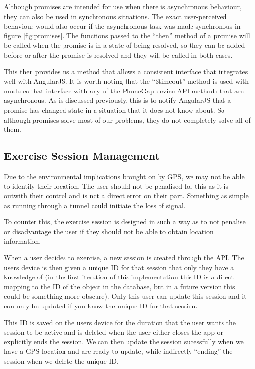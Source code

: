 Although promises are intended for use when there is asynchronous
behaviour, they can also be used in synchronous situations. The exact
user-perceived behaviour would also occur if the asynchronous task was
made synchronous in figure \ref{fig:promises}. The functions passed to
the ``then'' method of a promise will be called when the promise is in
a state of being resolved, so they can be added before or after the
promise is resolved and they will be called in both cases.

This then provides us a method that allows a consistent interface that
integrates well with AngularJS. It is worth noting that the
``\$timeout'' method is used with modules that interface with any of
the PhoneGap device API methods that are asynchronous. As is discussed
previously, this is to notify AngularJS that a promise has changed
state in a situation that it does not know about. So although promises
solve most of our problems, they do not completely solve all of them.

\subsection{Exercise Session Management}
\label{sec:session_mgmt}
Due to the environmental implications brought on by GPS, we may not be
able to identify their location. The user should not
be penalised for this as it is outwith their control and is not a
direct error on their part. Something as simple as running through a
tunnel could initiate the loss of signal. 

To counter this, the exercise session is designed in such a way as to
not penalise or disadvantage the user if they should not be able to
obtain location information. 

When a user decides to exercise, a new session is created through the
API. The users device is then given a unique ID for that session that
only they have a knowledge of (in the first iteration of this
implementation this ID is a direct mapping to the ID of the object in
the database, but in a future version this could be something more
obscure). Only this user can update this session and it can only be
updated if you know the unique ID for that session. 

This ID is saved on the users device for the duration that the user
wants the session to be active and is deleted when the user either
closes the app or explicitly ends the session. We can then update the
session sucessfully when we have a GPS location and are ready to
update, while indirectly ``ending'' the session when we delete the
unique ID.

